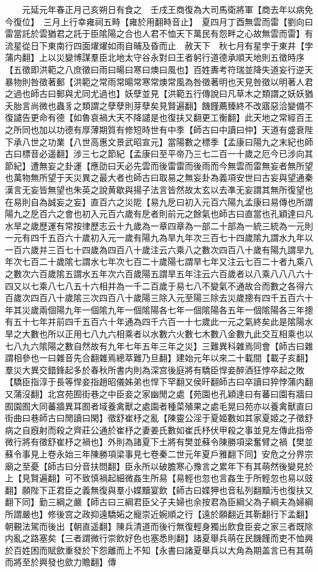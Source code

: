 　　元延元年春正月己亥朔日有食之　壬戌王商復為大司馬衛將軍【商去年以病免今復位】　三月上行幸雍祠五畤【雍於用翻畤音止】　夏四月丁酉無雲而雷【劉向曰雷當託於雲猶君之託于臣隂陽之合也人君不恤天下萬民有怨畔之心故無雲而雷】有流星從日下東南行四面燿燿如雨自晡及昏而止　赦天下　秋七月有星孛于東井【孛蒲内翻】上以災變博謀羣臣北地太守谷永對曰王者躬行道德承順天地則五徵時序【五徵即洪範之八庶徵曰雨曰暘曰寒曰燠曰風也】百姓夀考符瑞並降失道妄行逆天暴物則咎徵著郵【洪範之常雨常暘常寒常燠常風為咎徵著明也天見咎徵以明著人君之過也師古曰郵與尤同尤過也】妖孽並見【洪範五行傳說曰凡草木之類謂之妖妖猶夭胎言尚微也蟲豸之類謂之孽孽則芽孽矣見賢遍翻】饑饉薦臻終不改寤惡洽變備不復譴告更命有德【如魯哀禍大天不降譴是也復扶又翻更工衡翻】此天地之常經百王之所同也加以功德有厚薄期質有修短時世有中季【師古曰中讀曰仲】天道有盛衰陛下承八世之功業【八世高惠文景武昭宣元】當陽數之標季【孟康曰陽九之末紀也師古曰標音必遥翻】涉三七之節紀【孟康曰至平帝乃三七二百一十歲之厄今已涉向其節紀】遭無妄之卦運【應劭曰天必先雲而後雷雷而後雨而今無雲而雷無妄者無所望也萬物無所望于天災異之最大者也師古曰取易之無妄卦為義項安世曰古妄與望通秦漢言无妄皆無望也朱英之說黄歇與揚子法言皆然故太玄以去凖无妄謂其無所復望也在易則自為誠妄之妄】直百六之災阸【易九戹曰初入元百六陽九孟康曰易傳也所謂陽九之戹百六之會也初入元百六歲有戹者則前元之餘氣也師古曰直當也孔穎達曰凡水旱之歲歷運有常按律歷志云十九歲為一章四章為一部二十部為一統三統為一元則一元有四千五百六十歲初入元一歲有陽九為旱九年次三百七十四歲隂九謂水九年以一百六歲并三百七十四歲為四百八十歲注云六乘八之數次四百八十歲有陽九謂旱九年次七百二十歲隂七謂水七年次七百二十歲陽七謂旱七年又注云七百二十者九乘八之數次六百歲隂五謂水五年次六百歲陽五謂旱五年注云六百歲者以八乘八八八六十四又以七乘八七八五十六相并為一千二百歲于易七八不變氣不通故合而數之各得六百歲次四百八十歲隂三次四百八十歲陽三除入元至陽三除去災歲摠有四千五百六十年其災歲兩個陽九年一個隂九年一個隂陽各七年一個隂陽各五年一個隂陽各三年摠有五十七年并前四千五百六十年通為四千六百一十七歲此一元之氣終矣此是隂陽水旱之大數也所以正用七八九六相乘者以水數六火數七木數八金數九此交互相乘也以七八九六隂陽之數自然故有九年七年五年三年之災】三難異科雜焉同會【師古曰雜謂相參也一曰雜音先合翻雜焉總萃難乃旦翻】建始元年以來二十載間【載子亥翻】羣災大異交錯鋒起多於春秋所書内則為深宫後庭將有驕臣悍妾醉酒狂悖卒起之敗【驕臣指淳于長等悍妾指趙昭儀姊弟也悍下罕翻又侯旰翻師古曰卒讀曰猝悖蒲内翻又蒲沒翻】北宫苑囿街巷之中臣妾之家幽閒之處【苑園也孔穎達曰有蕃曰園有牆曰囿園囿大同蕃牆異耳囿者域養禽獸之處園者種菜殖果之處毛晃曰苑亦以養禽獸直曰街曲曰巷師古曰閒讀曰閑】徵舒崔杼之亂【陳靈公淫于夏姬數如其家夏姬之子徵舒病之自廐射而殺之齊莊公通於崔杼之妻姜氏數如崔氏杼伏甲殺之事並見左傳此指帝微行將有徵舒崔杼之禍也】外則為諸夏下土將有樊並蘇令陳勝項梁奮臂之禍【樊並蘇令事見上卷永始三年陳勝項梁事見七卷秦二世元年夏戶雅翻下同】安危之分界宗廟之至憂【師古曰分音扶問翻】臣永所以破膽寒心豫言之累年下有其萌然後變見於上【見賢遍翻】可不致慎禍起細微姦生所易【易輕也忽也言姦生于所輕忽也易以豉翻】願陛下正君臣之義無復與羣小媟黷宴飲【師古曰媟狎也音私列翻黷汚也復扶又翻下同】勤三綱之嚴【師古曰三綱君臣父子夫婦也余按君為臣綱父為子綱夫為婦綱所謂嚴也】修後宫之政抑遠驕妬之寵崇近婉順之行【遠於願翻近其靳翻行下孟翻】朝覲法駕而後出【朝直遥翻】陳兵清道而後行無復輕身獨出飲食臣妾之家三者既除内亂之路塞矣【三者謂微行崇飲好色也塞悉則翻】諸夏舉兵萌在民饑饉而吏不恤興於百姓困而賦歛重發於下怨離而上不知【永書曰諸夏舉兵以大角為期盖言已有其萌而將至於興發也歛力贍翻】傳
